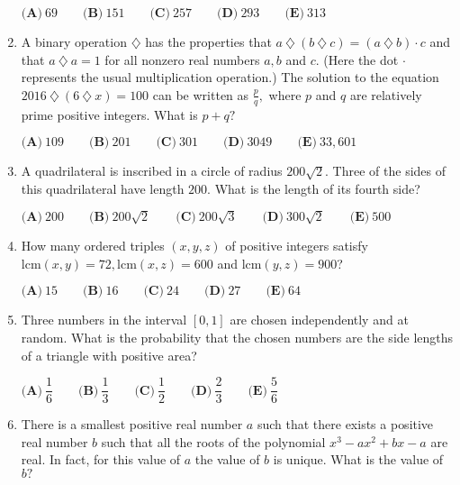 \documentclass{article}
\begin{document}
\begin{enumerate}[label=\arabic*., itemsep=0.5em]
$\textbf{(A)}\ 69\qquad\textbf{(B)}\ 151\qquad\textbf{(C)}\ 257\qquad\textbf{(D)}\ 293\qquad\textbf{(E)}\ 313$\par \vspace{0.5em}\item A binary operation $\diamondsuit $ has the properties that $a\ \diamondsuit\ (b\ \diamondsuit\ c) = (a\ \diamondsuit\ b)\cdot c$ and that $a\ \diamondsuit\ a = 1$ for all nonzero real numbers $a, b$ and $c.$ (Here the dot  $\cdot$  represents the usual multiplication operation.) The solution to the equation $2016\ \diamondsuit\ (6\ \diamondsuit\ x) = 100$ can be written as $\frac{p}{q},$ where $p$ and $q$ are relatively prime positive integers. What is $p + q?$ 

$\textbf{(A)}\ 109\qquad\textbf{(B)}\ 201\qquad\textbf{(C)}\ 301\qquad\textbf{(D)}\ 3049\qquad\textbf{(E)}\ 33,601$\par \vspace{0.5em}\item A quadrilateral is inscribed in a circle of radius $200\sqrt{2}.$ Three of the sides of this quadrilateral have length $200.$ What is the length of its fourth side? 

$\textbf{(A)}\ 200\qquad\textbf{(B)}\ 200\sqrt{2} \qquad\textbf{(C)}\ 200\sqrt{3} \qquad\textbf{(D)}\ 300\sqrt{2} \qquad\textbf{(E)}\ 500$\par \vspace{0.5em}\item How many ordered triples $(x,y,z)$ of positive integers satisfy $\text{lcm}(x,y) = 72, \text{lcm}(x,z) = 600$ and $\text{lcm}(y,z)=900$?

$\textbf{(A)}\ 15\qquad\textbf{(B)}\ 16\qquad\textbf{(C)}\ 24\qquad\textbf{(D)}\ 27\qquad\textbf{(E)}\ 64$\par \vspace{0.5em}\item Three numbers in the interval $\left[0,1\right]$ are chosen independently and at random. What is the probability that the chosen numbers are the side lengths of a triangle with positive area?

$\textbf{(A)}\ \dfrac{1}{6}\qquad\textbf{(B)}\ \dfrac{1}{3}\qquad\textbf{(C)}\ \dfrac{1}{2}\qquad\textbf{(D)}\ \dfrac{2}{3}\qquad\textbf{(E)}\ \dfrac{5}{6}$\par \vspace{0.5em}\item There is a smallest positive real number $a$ such that there exists a positive real number $b$ such that all the roots of the polynomial $x^3-ax^2+bx-a$ are real. In fact, for this value of $a$ the value of $b$ is unique. What is the value of $b?$


\end{enumerate}
\end{document}
